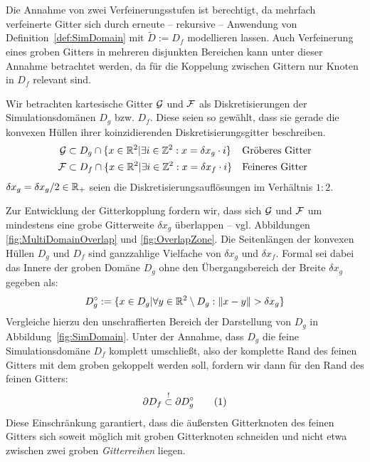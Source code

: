 Die Annahme von zwei Verfeinerungsstufen ist berechtigt, da mehrfach verfeinerte Gitter sich durch erneute -- rekursive -- Anwendung von Definition~\ref{def:SimDomain} mit \(\tilde{D} := D_f\) modellieren lassen. Auch Verfeinerung eines groben Gitters in mehreren disjunkten Bereichen kann unter dieser Annahme betrachtet werden, da für die Koppelung zwischen Gittern nur Knoten in \(D_f\) relevant sind.

\begin{Definition}
\label{def:DiskretRefinedGitter}
Wir betrachten kartesische Gitter \(\mathcal{G}\) und \(\mathcal{F}\) als Diskretisierungen der Simulationsdomänen \(D_g\) bzw. \(D_f\). Diese seien so gewählt, dass sie gerade die konvexen Hüllen ihrer koinzidierenden Diskretisierungsgitter beschreiben.
\begin{align*}
\mathcal{G} &\subset D_g \cap \{ x \in \mathbb{R}^2 | \exists i \in \mathbb{Z}^2 : x = \delta x_g \cdot i \} && \text{Gröberes Gitter} \\
\mathcal{F} &\subset D_f \cap \{ x \in \mathbb{R}^2 | \exists i \in \mathbb{Z}^2 : x = \delta x_f \cdot i \} && \text{Feineres Gitter}
\end{align*}
\(\delta x_g = \delta x_g / 2 \in \mathbb{R}_+\) seien die Diskretisierungsauflösungen im Verhältnis \(1:2\).
\end{Definition}

Zur Entwicklung der Gitterkopplung fordern wir, dass sich \(\mathcal{G}\) und \(\mathcal{F}\) um mindestens eine grobe Gitterweite \(\delta x_g\) überlappen -- vgl. Abbildungen \ref{fig:MultiDomainOverlap} und \ref{fig:OverlapZone}. Die Seitenlängen der konvexen Hüllen \(D_g\) und \(D_f\) sind ganzzahlige Vielfache von \(\delta x_g\) und \(\delta x_f\). Formal sei dabei das Innere der groben Domäne \(D_g\) ohne den Übergangsbereich der Breite \(\delta x_g\) gegeben als:
\[ D_g^\circ := \{ x \in D_g | \forall y \in \mathbb{R}^2 \setminus D_g : \|x-y\| > \delta x_g \} \]
Vergleiche hierzu den unschraffierten Bereich der Darstellung von \(D_g\) in Abbildung~\ref{fig:SimDomain}.
Unter der Annahme, dass \(D_g\) die feine Simulationsdomäne \(D_f\) komplett umschließt, also der komplette Rand des feinen Gitters mit dem groben gekoppelt werden soll, fordern wir dann für den Rand des feinen Gitters:
\[ \partial D_f \stackrel{!}{\subset} \partial D_g^\circ \numberthis\label{eq:FineBorderIntersectCoarseGrid} \]
Diese Einschränkung garantiert, dass die äußersten Gitterknoten des feinen Gitters sich soweit möglich mit groben Gitterknoten schneiden und nicht etwa zwischen zwei groben \emph{Gitterreihen} liegen.

